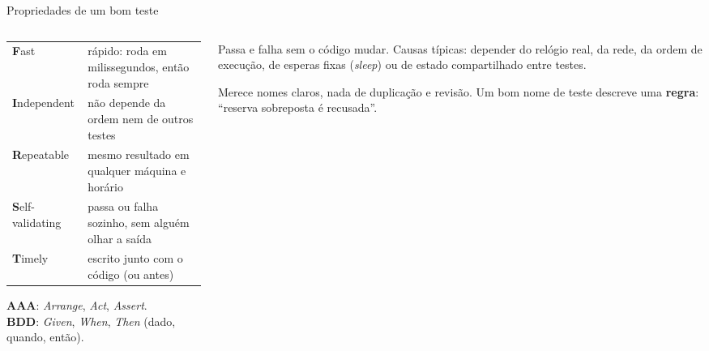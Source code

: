 \begin{frame}{Propriedades de um bom teste}
  \begin{columns}[T]
    \begin{column}{0.5\textwidth}
      \scriptsize
      \begin{tabularx}{\linewidth}{@{}l L@{}}
        \toprule
         &  \\
        \midrule
        \textbf{F}ast & rápido: roda em milissegundos, então roda sempre \\
        \textbf{I}ndependent & não depende da ordem nem de outros testes \\
        \textbf{R}epeatable & mesmo resultado em qualquer máquina e horário \\
        \textbf{S}elf-validating & passa ou falha sozinho, sem alguém olhar a saída \\
        \textbf{T}imely & escrito junto com o código (ou antes) \\
        \bottomrule
      \end{tabularx}
      \begin{conceito}[Estrutura]
        \textbf{AAA}: \emph{Arrange}, \emph{Act}, \emph{Assert}.\\
        \textbf{BDD}: \emph{Given}, \emph{When}, \emph{Then} (dado, quando, então).
      \end{conceito}
    \end{column}
    \begin{column}{0.48\textwidth}
      \begin{erro}
        Passa e falha sem o código mudar. Causas típicas: depender do relógio real, da rede, da ordem de execução, de esperas fixas (\emph{sleep}) ou de estado compartilhado entre testes.
      \end{erro}
      \begin{dica}
        Merece nomes claros, nada de duplicação e revisão. Um bom nome de teste descreve uma \textbf{regra}: ``reserva sobreposta é recusada''.
      \end{dica}
    \end{column}
  \end{columns}
\end{frame}

